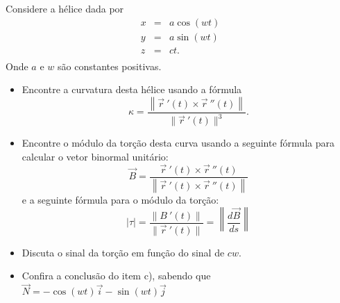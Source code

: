 \begin{exeresol}
Considere a hélice dada por
\begin{eqnarray*}
x&=&a\cos(wt)\\
y&=&a\sin(wt)\\
z&=&ct.\\
\end{eqnarray*}
Onde $a$ e $w$ são constantes positivas.
\begin{itemize}
\item[a)] Encontre  a curvatura desta hélice usando a fórmula
$$\kappa=\frac{\left\|\vec{r}~\!'(t)\times \vec{r}~\!''(t)\right\|}{\|\vec{r}~\!'(t)\|^3}.$$
\item[b)] Encontre o módulo da torção desta curva usando a seguinte fórmula para calcular o vetor binormal unitário: $$\vec{B}=\frac{\vec{r}~\!'(t)\times \vec{r}~\!''(t)}{\left\|\vec{r}~\!'(t)\times \vec{r}~\!''(t)\right\|}$$
e a seguinte fórmula para o módulo da torção:
$$|\tau|=\frac{\|B\ \!'(t)\|}{\|\vec{r}\ \!'(t)\|}=\left\|\frac{d\vec{B}}{ds}\right\|$$

\item[c)] Discuta o sinal da torção em função do sinal de $cw$.
\item[d)] Confira a conclusão do item c), sabendo que $\vec{N}=-\cos(wt)\vec{i}-\sin(wt)\vec{j}$
\end{itemize}
\end{exeresol}

